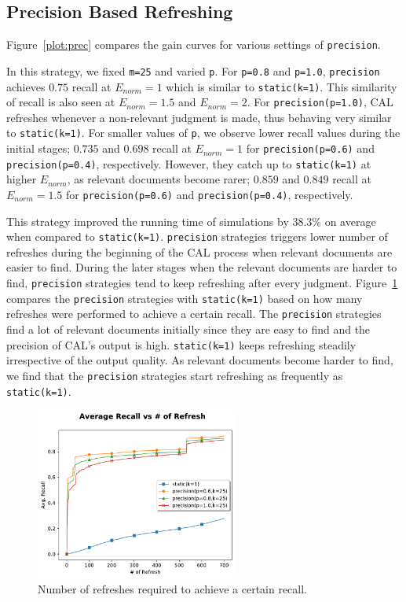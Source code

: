 \subsection*{Precision Based Refreshing}

Figure~\ref{plot:prec} compares the gain curves for
various settings of \texttt{precision}.

In this strategy, we fixed \texttt{m=25} and varied \texttt{p}. For
\texttt{p=0.8} and \texttt{p=1.0}, \texttt{precision} achieves $0.75$ recall at
$E_{norm} = 1$ which is similar to \texttt{static(k=1)}. This
similarity of recall is also seen at $E_{norm} = 1.5$ and $E_{norm} = 2$. For
\texttt{precision(p=1.0)}, CAL refreshes whenever a non-relevant judgment
is made, thus behaving very similar to \texttt{static(k=1)}. For
smaller values of \texttt{p}, we observe lower recall values during the initial stages; 
$0.735$ and $0.698$ recall at $E_{norm} = 1$ for \texttt{precision(p=0.6)} and
\texttt{precision(p=0.4)}, respectively. However, they catch up to
\texttt{static(k=1)} at higher $E_{norm}$, as relevant documents
become rarer; $0.859$ and $0.849$ recall at $E_{norm} = 1.5$ for
\texttt{precision(p=0.6)} and \texttt{precision(p=0.4)}, respectively.

This strategy improved the running time of simulations by $38.3\%$
on average when compared to \texttt{static(k=1)}.
\texttt{precision} strategies triggers lower number of refreshes during the
beginning of the CAL process when relevant documents are easier to find. During
the later stages when the relevant documents are harder to find,
\texttt{precision} strategies tend to keep refreshing after every judgment.
Figure~\ref{plot:prec2} compares the \texttt{precision} strategies with
\texttt{static(k=1)} based on how many refreshes were performed to achieve a
certain recall. The \texttt{precision} strategies find a lot of relevant
documents initially since they are easy to find and the precision of CAL's
output is high. \texttt{static(k=1)} keeps refreshing steadily irrespective of
the output quality. As relevant documents become harder to find, we find that
the \texttt{precision} strategies start refreshing as frequently as
\texttt{static(k=1)}.

\begin{figure}
    \centering
    \includegraphics[width=0.6\textwidth]{plots/prec2.pdf}
    \caption{Number of refreshes required to achieve a certain recall.}
    \label{plot:prec2}
\end{figure}


